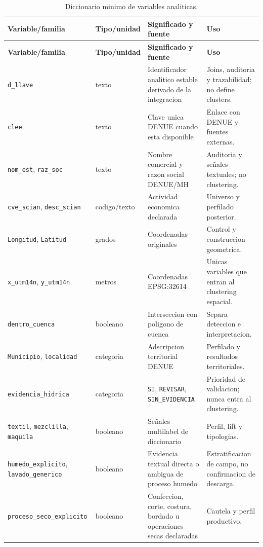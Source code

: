 \documentclass[11pt,letterpaper]{article}
\begin{document}
\begin{longtable}{p{}p{}p{}p{}}
\caption{Diccionario minimo de variables analiticas.}\\
\toprule
\textbf{Variable/familia} & \textbf{Tipo/unidad} & \textbf{Significado y fuente} & \textbf{Uso} \\
\midrule
\endfirsthead
\toprule
\textbf{Variable/familia} & \textbf{Tipo/unidad} & \textbf{Significado y fuente} & \textbf{Uso} \\
\midrule
\endhead
\texttt{d\_llave} & texto & Identificador analitico estable derivado de la integracion & Joins, auditoria y trazabilidad; no define clusters. \\
\texttt{clee} & texto & Clave unica DENUE cuando esta disponible & Enlace con DENUE y fuentes externas. \\
\texttt{nom\_est}, \texttt{raz\_soc} & texto & Nombre comercial y razon social DENUE/MH & Auditoria y señales textuales; no clustering. \\
\texttt{cve\_scian}, \texttt{desc\_scian} & codigo/texto & Actividad economica declarada & Universo y perfilado posterior. \\
\texttt{Longitud}, \texttt{Latitud} & grados & Coordenadas originales & Control y construccion geometrica. \\
\texttt{x\_utm14n}, \texttt{y\_utm14n} & metros & Coordenadas EPSG:32614 & Unicas variables que entran al clustering espacial. \\
\texttt{dentro\_cuenca} & booleano & Interseccion con poligono de cuenca & Separa deteccion e interpretacion. \\
\texttt{Municipio}, \texttt{localidad} & categoria & Adscripcion territorial DENUE & Perfilado y resultados territoriales. \\
\texttt{evidencia\_hidrica} & categoria & \texttt{SI}, \texttt{REVISAR}, \texttt{SIN\_EVIDENCIA} & Prioridad de validacion; nunca entra al clustering. \\
\texttt{textil}, \texttt{mezclilla}, \texttt{maquila} & booleano & Señales multilabel de diccionario & Perfil, lift y tipologias. \\
\texttt{humedo\_explicito}, \texttt{lavado\_generico} & booleano & Evidencia textual directa o ambigua de proceso humedo & Estratificacion de campo, no confirmacion de descarga. \\
\texttt{proceso\_seco\_explicito} & booleano & Confeccion, corte, costura, bordado u operaciones secas declaradas & Cautela y perfil productivo. \\

\end{longtable}
\end{document}
